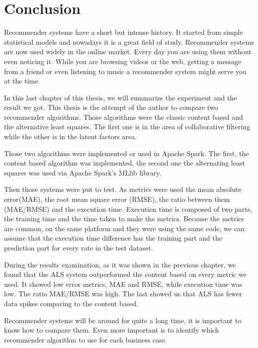 \section{Conclusion}
Recommender systems have a short but intense history. It started from simple statistical models and nowadays it is a great field of study. Recommender systems are now used widely in the online market. Every day you are using them without even noticing it. While you are browsing videos or the web, getting a message from a friend or even listening to music a recommender system might serve you at the time.

In this last chapter of this thesis, we will summarize the experiment and the result we got. This thesis is the attempt of the author to compare two recommender algorithms. Those algorithms were the classic content based and the alternative least squares. The first one is in the area of collaborative filtering while the other is in the latent factors area.

Those two algorithms were implemented or used in Apache Spark. The first, the content based algorithm was implemented, the second one the alternating least squares was used via Apache Spark's MLlib library.

Then those systems were put to test. As metrics were used the mean absolute error(MAE), the root mean square error (RMSE), the ratio between them (MAE/RMSE) and the execution time. Execution time is composed of two parts, the training time and the time taken to make the metrics. Because the metrics are common, on the same platform and they were using the same code, we can assume that the execution time difference has the training part and the prediction part for every rate in the test dataset.

During the results examination, as it was shown in the previous chapter, we found that the ALS system outperformed the content based on every metric we used. It showed low error metrics, MAE and RMSE, while execution time was low. The ratio MAE/RMSE was high. The last showed us that ALS has fewer data spikes comparing to the content based.

Recommender systems will be around for quite a long time, it is important to know how to compare them. Even more important is to identify which recommender algorithm to use for each business case.